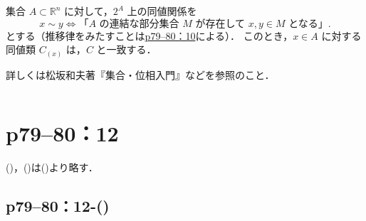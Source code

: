 \begin{column}
    集合 $A \subset \mathbb{R}^n$ に対して，$2^A$ 上の同値関係を
    \[
        x \sim y　\iff \text{「$A$ の連結な部分集合 $M$ が存在して $x, y \in M$ となる」}.
    \]
    とする（推移律をみたすことは\hyperref[p79--80：10]{p79--80：10}による）．
    このとき，$x \in A$ に対する同値類 $C_{(x)}$ は，$C$ と一致する．

    詳しくは松坂和夫著『集合・位相入門』などを参照のこと．
\end{column}


\section*{p79--80：12} \label{p79--80：12}

()，()は()より略す．


\subsection*{p79--80：12-()} \label{p79--80：12-(\romannumeral3)}


